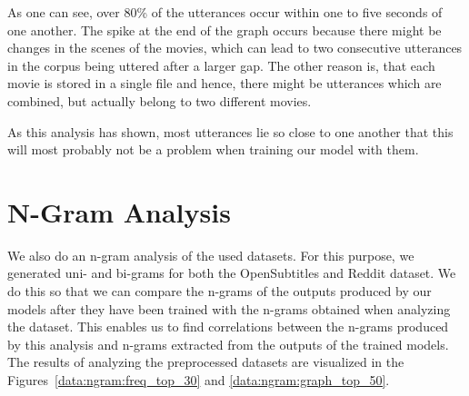 As one can see, over 80\% of the utterances occur within one to five seconds of one another. The spike at the end of the graph occurs because there might be changes in the scenes of the movies, which can lead to two consecutive utterances in the corpus being uttered after a larger gap. The other reason is, that each movie is stored in a single file and hence, there might be utterances which are combined, but actually belong to two different movies.

As this analysis has shown, most utterances lie so close to one another that this will most probably not be a problem when training our model with them.

\section{N-Gram Analysis}
\label{chapter:data:ngram}
We also do an n-gram analysis of the used datasets. For this purpose, we generated uni- and bi-grams for both the OpenSubtitles and Reddit dataset. We do this so that we can compare the n-grams of the outputs produced by our models after they have been trained with the n-grams obtained when analyzing the dataset. This enables us to find correlations between the n-grams produced by this analysis and n-grams extracted from the outputs of the trained models. The results of analyzing the preprocessed datasets are visualized in the Figures~\ref{data:ngram:freq_top_30} and \ref{data:ngram:graph_top_50}.
 
